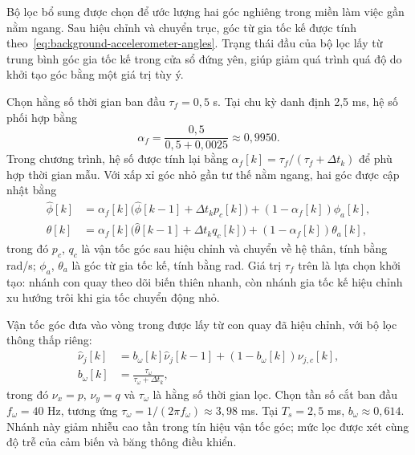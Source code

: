 Bộ lọc bổ sung được chọn để ước lượng hai góc nghiêng trong miền làm việc gần nằm ngang. Sau hiệu chỉnh và chuyển trục, góc từ gia tốc kế được tính theo~\eqref{eq:background-accelerometer-angles}. Trạng thái đầu của bộ lọc lấy từ trung bình góc gia tốc kế trong cửa sổ đứng yên, giúp giảm quá trình quá độ do khởi tạo góc bằng một giá trị tùy ý.

Chọn hằng số thời gian ban đầu $\tau_f=0{,}5$ s. Tại chu kỳ danh định 2,5 ms, hệ số phối hợp bằng
\begin{equation}
	\alpha_f=\frac{0{,}5}{0{,}5+0{,}0025}
	\approx0{,}9950.
	\label{eq:design-complementary-coefficient}
\end{equation}
Trong chương trình, hệ số được tính lại bằng $\alpha_f[k]=\tau_f/(\tau_f+\Delta t_k)$ để phù hợp thời gian mẫu. Với xấp xỉ góc nhỏ gần tư thế nằm ngang, hai góc được cập nhật bằng
\begin{equation}
	\begin{aligned}
		\widehat{\phi}[k]&=\alpha_f[k]\bigl(\widehat{\phi}[k-1]
		+\Delta t_k p_c[k]\bigr)+(1-\alpha_f[k])\phi_a[k],\\
		\widehat{\theta}[k]&=\alpha_f[k]\bigl(\widehat{\theta}[k-1]
		+\Delta t_k q_c[k]\bigr)+(1-\alpha_f[k])\theta_a[k],
	\end{aligned}
	\label{eq:design-complementary-update}
\end{equation}
trong đó $p_c$, $q_c$ là vận tốc góc sau hiệu chỉnh và chuyển về hệ thân, tính bằng rad/s; $\phi_a$, $\theta_a$ là góc từ gia tốc kế, tính bằng rad. Giá trị $\tau_f$ trên là lựa chọn khởi tạo: nhánh con quay theo dõi biến thiên nhanh, còn nhánh gia tốc kế hiệu chỉnh xu hướng trôi khi gia tốc chuyển động nhỏ.

Vận tốc góc đưa vào vòng trong được lấy từ con quay đã hiệu chỉnh, với bộ lọc thông thấp riêng:
\begin{equation}
	\begin{aligned}
		\widehat{\nu}_j[k]
		&=b_\omega[k]\widehat{\nu}_j[k-1]
		+(1-b_\omega[k])\nu_{j,c}[k],\\
		b_\omega[k]&=\frac{\tau_\omega}{\tau_\omega+\Delta t_k},
	\end{aligned}
	\label{eq:design-rate-low-pass}
\end{equation}
trong đó $\nu_x=p$, $\nu_y=q$ và $\tau_\omega$ là hằng số thời gian lọc. Chọn tần số cắt ban đầu $f_\omega=40$ Hz, tương ứng $\tau_\omega=1/(2\pi f_\omega)\approx3{,}98$ ms. Tại $T_s=2{,}5$ ms, $b_\omega\approx0{,}614$. Nhánh này giảm nhiễu cao tần trong tín hiệu vận tốc góc; mức lọc được xét cùng độ trễ của cảm biến và băng thông điều khiển.

